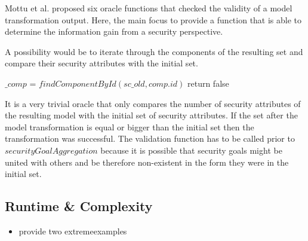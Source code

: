 Mottu et al. \cite{mottu} proposed six oracle functions that checked the validity of a model transformation output. Here, the main focus to provide a function that is able to determine the information gain from a security perspective.

A possibility would be to iterate through the components of the resulting set and compare their security attributes with the initial set.

\begin{algorithm}[H]
\begin{algorithmic}
\State $\_comp$ = $findComponentById(sc\_old, comp.id)$
return false
\EndIf
\EndFor
\EndFor
\EndFunction
\end{algorithmic}
\end{algorithm}

It is a very trivial oracle that only compares the number of security attributes of the resulting model with the initial set of security attributes. If the set after the model transformation is equal or bigger than the initial set then the transformation was successful. The validation function has to be called prior to $securityGoalAggregation$ because it is possible that security goals might be united with others and be therefore non-existent in the form they were in the initial set. 

\subsection{Runtime \& Complexity}

\begin{itemize}
\item provide two \glqq extreme\grqq examples
\end{itemize}

